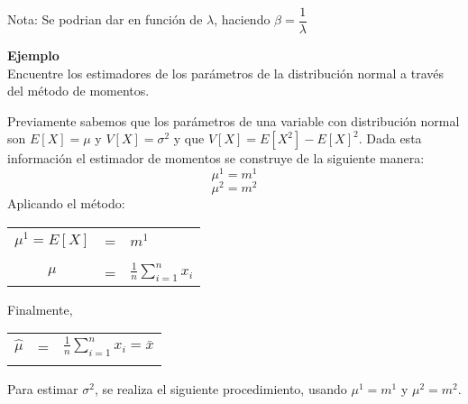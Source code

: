 \documentclass[base=hide,11pt]{elegantbook}
\begin{document}
{\begin{center}
Nota: Se podrian dar en función de $\lambda$, haciendo $\beta=\dfrac{1}{\lambda}$
	\end{center}

\textcolor{col3}{\bf \large Ejemplo} \\
Encuentre los estimadores de los parámetros de la distribución normal a través del método de momentos.

Previamente sabemos que los parámetros de una variable con distribución normal son $E[X]=\mu$ y $V[X]=\sigma^{2}$ y que $V[X]=E[X^{2}]-E[X]^{2}$. Dada esta información el estimador de momentos se construye de la siguiente manera: \\
			$$\mu^{1}=m^{1} $$
			$$\mu^{2}=m^{2} $$
			Aplicando el método:
			
			\begin{center}
				\begin{tabular}{cll}
					$\mu^{1}=E[X]$&=&$m^{1}$\\
					&&\\
					$\mu$&=&$\displaystyle\frac{1}{n}\sum_{i=1}^{n}x_{i}$\\
				\end{tabular}
			\end{center}
			
			Finalmente,
			\begin{center}
				\begin{tabular}{cll}
					$\widehat{\mu}$& = &$\displaystyle\frac{1}{n}\sum_{i=1}^{n} x_{i}=\bar{x}$\\
					&&\\
				\end{tabular}
			\end{center}
%			
			Para estimar $\sigma^{2}$, se realiza el siguiente procedimiento, usando $\mu^{1}=m^{1}$  y $\mu^{2}=m^{2}$.
			
}
\end{document}
